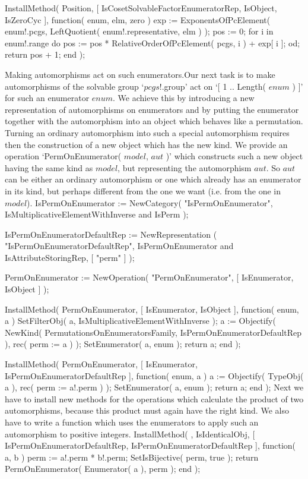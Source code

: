 \begintt
InstallMethod( Position, [ IsCosetSolvableFactorEnumeratorRep,
        IsObject, IsZeroCyc ],
    function( enum, elm, zero )
    exp := ExponentsOfPcElement( enum!.pcgs,
                   LeftQuotient( enum!.representative, elm ) );
    pos := 0;
    for i  in enum!.range  do
        pos := pos * RelativeOrderOfPcElement( pcgs, i ) + exp[ i ];
    od;
    return pos + 1;
end );
\endtt

{\bsf  Making automorphisms act  on such enumerators.}\quad Our next task
is to make automorphisms of the  solvable group `$pcgs$!.group' act on `[
1 .. Length( $enum$ )  ]' for such an  enumerator $enum$. We achieve this
by  introducing a new  representation of automorphisms on enumerators and
by putting the enumerator together  with the automorphism into an  object
which behaves like  a permutation. Turning  an ordinary automorphism into
such  a special  automorphism requires  then   the construction of  a new
object which has the new kind. We provide an operation `PermOnEnumerator(
$model$, $aut$ )' which constructs such a new object having the same kind
as  $model$,  but representing the  automorphism  $aut$. So $aut$  can be
either an ordinary automorphism or one which already has an enumerator in
its kind, but perhaps  different from the one  we want (i.e. from the one
in $model$).
\begintt
IsPermOnEnumerator := NewCategory( "IsPermOnEnumerator",
    IsMultiplicativeElementWithInverse and IsPerm );
\endtt

\begintt
IsPermOnEnumeratorDefaultRep := NewRepresentation
    ( "IsPermOnEnumeratorDefaultRep",
      IsPermOnEnumerator and IsAttributeStoringRep,
      [ "perm" ] );

PermOnEnumerator := NewOperation( "PermOnEnumerator",
    [ IsEnumerator, IsObject ] );
\endtt

\begintt
InstallMethod( PermOnEnumerator,
        [ IsEnumerator, IsObject ],
    function( enum, a )
    SetFilterObj( a, IsMultiplicativeElementWithInverse );
    a := Objectify( NewKind( PermutationsOnEnumeratorsFamily,
                 IsPermOnEnumeratorDefaultRep ),
                 rec( perm := a ) );
    SetEnumerator( a, enum );
    return a;
end );
\endtt

\begintt
InstallMethod( PermOnEnumerator,
        [ IsEnumerator, IsPermOnEnumeratorDefaultRep ],
    function( enum, a )
    a := Objectify( TypeObj( a ), rec( perm := a!.perm ) );
    SetEnumerator( a, enum );
    return a;
end );
\endtt
Next we  have to install new  methods for the  operations which calculate
the  product of two automorphisms, because   this product must again have
the    right kind. We    also have to write  a    function which uses the
enumerators to apply such an automorphism to positive integers.
\begintt
InstallMethod( \*, IsIdenticalObj,
        [ IsPermOnEnumeratorDefaultRep, IsPermOnEnumeratorDefaultRep ],
    function( a, b )
    perm := a!.perm * b!.perm;
    SetIsBijective( perm, true );
    return PermOnEnumerator( Enumerator( a ), perm );
end );
\endtt

